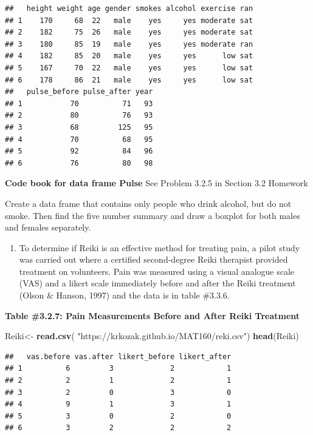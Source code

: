 \documentclass[
]{book}
\newenvironment{Shaded}{\begin{snugshade}}{\end{snugshade}}
\newcommand{\KeywordTok}[1]{\textcolor[rgb]{0.13,0.29,0.53}{\textbf{#1}}}
\newcommand{\NormalTok}[1]{#1}
\newcommand{\StringTok}[1]{\textcolor[rgb]{0.31,0.60,0.02}{#1}}
\providecommand{\tightlist}{%
  \setlength{\itemsep}{0pt}\setlength{\parskip}{0pt}}
\begin{document}
\begin{verbatim}
##   height weight age gender smokes alcohol exercise ran
## 1    170     68  22   male    yes     yes moderate sat
## 2    182     75  26   male    yes     yes moderate sat
## 3    180     85  19   male    yes     yes moderate ran
## 4    182     85  20   male    yes     yes      low sat
## 5    167     70  22   male    yes     yes      low sat
## 6    178     86  21   male    yes     yes      low sat
##   pulse_before pulse_after year
## 1           70          71   93
## 2           80          76   93
## 3           68         125   95
## 4           70          68   95
## 5           92          84   96
## 6           76          80   98
\end{verbatim}

\textbf{Code book for data frame Pulse} See Problem 3.2.5 in Section 3.2 Homework

Create a data frame that contains only people who drink alcohol, but do not smoke. Then find the five number summary and draw a boxplot for both males and females separately.

\begin{enumerate}
\def\labelenumi{\arabic{enumi}.}
\setcounter{enumi}{8}
\tightlist
\item
  To determine if Reiki is an effective method for treating pain, a pilot study was carried out where a certified second-degree Reiki therapist provided treatment on volunteers. Pain was measured using a visual analogue scale (VAS) and a likert scale immediately before and after the Reiki treatment (Olson \& Hanson, 1997) and the data is in table \#3.3.6.
\end{enumerate}

\textbf{Table \#3.2.7: Pain Measurements Before and After Reiki Treatment}

\begin{Shaded}
\begin{Highlighting}[]
\NormalTok{Reiki<-}\StringTok{ }\KeywordTok{read.csv}\NormalTok{(}
  \StringTok{"https://krkozak.github.io/MAT160/reki.csv"}\NormalTok{)}
\KeywordTok{head}\NormalTok{(Reiki)}
\end{Highlighting}
\end{Shaded}

\begin{verbatim}
##   vas.before vas.after likert_before likert_after
## 1          6         3             2            1
## 2          2         1             2            1
## 3          2         0             3            0
## 4          9         1             3            1
## 5          3         0             2            0
## 6          3         2             2            2
\end{verbatim}
\end{document}
